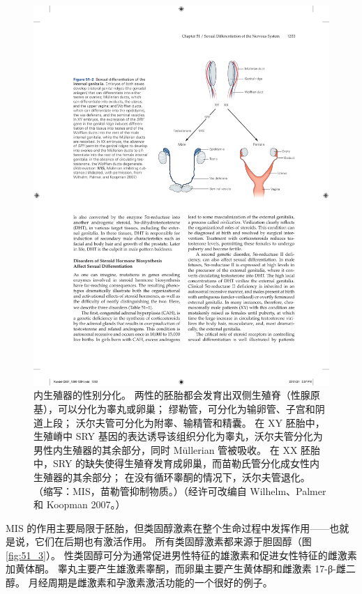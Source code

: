 \begin{figure}[htbp]
	\centering
	\includegraphics[width=0.65\linewidth]{chap51/fig_51_2}
	\caption{内生殖器的性别分化。 两性的胚胎都会发育出双侧生殖脊（性腺原基），可以分化为睾丸或卵巢； 缪勒管，可分化为输卵管、子宫和阴道上段； 沃尔夫管可分化为附睾、输精管和精囊。 在 XY 胚胎中，生殖嵴中 SRY 基因的表达诱导该组织分化为睾丸，沃尔夫管分化为男性内生殖器的其余部分，同时 Müllerian 管被吸收。 在 XX 胚胎中，SRY 的缺失使得生殖脊发育成卵巢，而苗勒氏管分化成女性内生殖器的其余部分； 在没有循环睾酮的情况下，沃尔夫管退化。 （缩写：MIS，苗勒管抑制物质。）（经许可改编自 Wilhelm、Palmer 和 Koopman 2007。）}
	\label{fig:51_2}
\end{figure}

MIS 的作用主要局限于胚胎，但类固醇激素在整个生命过程中发挥作用——也就是说，它们在后期也有激活作用。 
所有类固醇激素都来源于胆固醇（图 \ref{fig:51_3}）。 
性类固醇可分为通常促进男性特征的雄激素和促进女性特征的雌激素加黄体酮。 睾丸主要产生雄激素睾酮，而卵巢主要产生黄体酮和雌激素 17-β-雌二醇。 月经周期是雌激素和孕激素激活功能的一个很好的例子。

